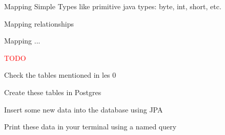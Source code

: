 \documentclass{beamer}
\newcommand{\red}[1]{
\textcolor{red}{#1}
}
\begin{document}
\begin{slide}{
\item Mapping Simple Types like primitive java types: byte, int, short, etc.
\item Mapping relationships
\item Mapping ...
\item \red{TODO}

}
\end{slide}  

\begin{slide}{
\item Check the tables mentioned in les 0
\item Create these tables in Postgres
\item Insert some new data into the database using JPA	
\item Print these data in your terminal using a named query 
}\end{slide}
\end{document}
